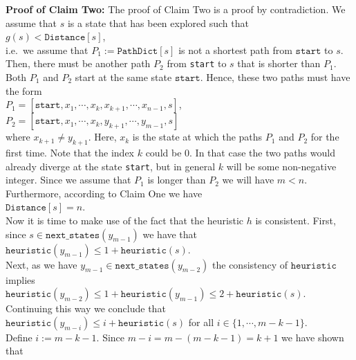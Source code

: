 \noindent
\textbf{Proof of Claim Two:}  The proof of Claim Two is a proof by contradiction.  We assume that $s$ is a
state that has been explored such that 
\\[0.2cm]
\hspace*{1.3cm}
$g(s) < \mathtt{Distance}[s]$,
\\[0.2cm]
i.e.~we assume that $P_1 := \texttt{PathDict}[s]$ is not a shortest path from $\texttt{start}$ to $s$.  Then,
there must be another path $P_2$ from \texttt{start} to $s$ that is shorter than $P_1$.  Both $P_1$ and $P_2$
start at the same state $\texttt{start}$.  Hence, these two paths must have the form
\\[0.2cm]
\hspace*{1.3cm}
$P_1 = [\texttt{start},x_1,\cdots,x_k, x_{k+1},\cdots,x_{n-1},s]$,  \quad 
$P_2 = [\texttt{start},x_1,\cdots,x_k, y_{k+1},\cdots,y_{m-1},s]$ \quad 
\\[0.2cm]
where $x_{k+1} \not= y_{k+1}$.  Here, $x_k$ is the state at which the paths $P_1$ and $P_2$  for
the first time.  Note that the
index $k$ could be $0$.  In that case the two paths would already diverge at the state \texttt{start}, but in
general $k$ will be some non-negative integer.  Since we assume that $P_1$ is longer than $P_2$ we will have
$m < n$.  Furthermore, according to Claim One we have
\\[0.2cm]
\hspace*{1.3cm}
$\mathtt{Distance}[s] = n$.
\\[0.2cm]
Now it is time to make use of the fact that the heuristic $h$ is consistent.  First, since
$s \in \texttt{next\_states}(y_{m-1})$  we have that 
\\[0.2cm]
\hspace*{1.3cm}
$\texttt{heuristic}(y_{m-1}) \leq 1 + \texttt{heuristic}(s)$.
\\[0.2cm]
Next, as we have $y_{m-1} \in \texttt{next\_states}(y_{m-2})$ the consistency of $\texttt{heuristic}$ implies
\\[0.2cm]
\hspace*{1.3cm}
$\texttt{heuristic}(y_{m-2}) \leq 1 + \texttt{heuristic}(y_{m-1}) \leq 2 + \texttt{heuristic}(s)$.
\\[0.2cm]
Continuing this way we conclude that
\\[0.2cm]
\hspace*{1.3cm}
$\texttt{heuristic}(y_{m-i}) \leq i + \texttt{heuristic}(s)$  \quad for all $i\in\{1,\cdots,m-k-1\}$.
\\[0.2cm]
Define $i:= m - k - 1$.  Since $m-i = m - (m - k - 1) = k+1$ we have shown that

